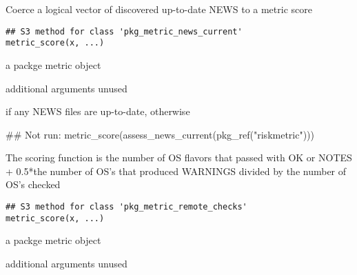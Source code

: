 \documentclass[a4paper]{book}
\begin{document}
%
\begin{Description}
Coerce a logical vector of discovered up-to-date NEWS to a metric score
\end{Description}
%
\begin{Usage}
\begin{verbatim}
## S3 method for class 'pkg_metric_news_current'
metric_score(x, ...)
\end{verbatim}
\end{Usage}
%
\begin{Arguments}
\begin{ldescription}
\item[\code{x}] a  packge metric object

\item[\code{...}] additional arguments unused
\end{ldescription}
\end{Arguments}
%
\begin{Value}
 if any NEWS files are up-to-date, otherwise 
\end{Value}
%
\begin{Examples}
\begin{ExampleCode}
## Not run: metric_score(assess_news_current(pkg_ref("riskmetric")))

\end{ExampleCode}
\end{Examples}
%
\begin{Description}
The scoring function is the number of OS flavors that passed with OK or NOTES + 0.5*the number of OS's that produced WARNINGS divided by the number of OS's checked
\end{Description}
%
\begin{Usage}
\begin{verbatim}
## S3 method for class 'pkg_metric_remote_checks'
metric_score(x, ...)
\end{verbatim}
\end{Usage}
%
\begin{Arguments}
\begin{ldescription}
\item[\code{x}] a  packge metric object

\item[\code{...}] additional arguments unused
\end{ldescription}
\end{Arguments}
\end{document}

